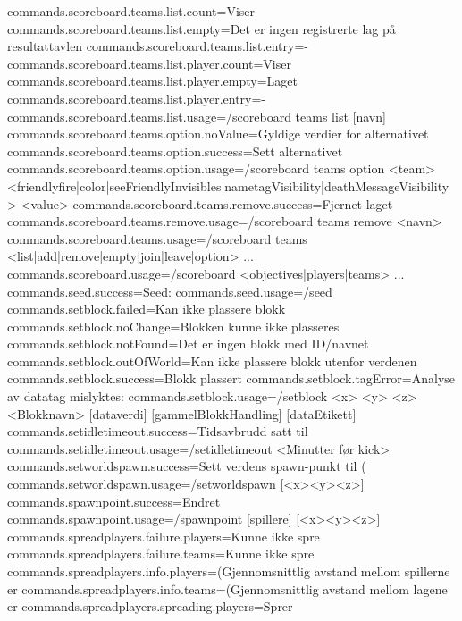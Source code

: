 commands.scoreboard.teams.list.count=Viser %
commands.scoreboard.teams.list.empty=Det er ingen registrerte lag på resultattavlen
commands.scoreboard.teams.list.entry=-%
commands.scoreboard.teams.list.player.count=Viser %
commands.scoreboard.teams.list.player.empty=Laget %
commands.scoreboard.teams.list.player.entry=- %
commands.scoreboard.teams.list.usage=/scoreboard teams list [navn]
commands.scoreboard.teams.option.noValue=Gyldige verdier for alternativet %
commands.scoreboard.teams.option.success=Sett alternativet %
commands.scoreboard.teams.option.usage=/scoreboard teams option <team> <friendlyfire|color|seeFriendlyInvisibles|nametagVisibility|deathMessageVisibility> <value>
commands.scoreboard.teams.remove.success=Fjernet laget %
commands.scoreboard.teams.remove.usage=/scoreboard teams remove <navn>
commands.scoreboard.teams.usage=/scoreboard teams <list|add|remove|empty|join|leave|option> ...
commands.scoreboard.usage=/scoreboard <objectives|players|teams> ...
commands.seed.success=Seed: %
commands.seed.usage=/seed
commands.setblock.failed=Kan ikke plassere blokk
commands.setblock.noChange=Blokken kunne ikke plasseres
commands.setblock.notFound=Det er ingen blokk med ID/navnet %
commands.setblock.outOfWorld=Kan ikke plassere blokk utenfor verdenen
commands.setblock.success=Blokk plassert
commands.setblock.tagError=Analyse av datatag mislyktes: %
commands.setblock.usage=/setblock <x> <y> <z> <Blokknavn> [dataverdi] [gammelBlokkHandling] [dataEtikett]
commands.setidletimeout.success=Tidsavbrudd satt til %
commands.setidletimeout.usage=/setidletimeout <Minutter før kick>
commands.setworldspawn.success=Sett verdens spawn-punkt til (%
commands.setworldspawn.usage=/setworldspawn [<x><y><z>]
commands.spawnpoint.success=Endret %
commands.spawnpoint.usage=/spawnpoint [spillere] [<x><y><z>]
commands.spreadplayers.failure.players=Kunne ikke spre %
commands.spreadplayers.failure.teams=Kunne ikke spre %
commands.spreadplayers.info.players=(Gjennomsnittlig avstand mellom spillerne er %
commands.spreadplayers.info.teams=(Gjennomsnittlig avstand mellom lagene er %
commands.spreadplayers.spreading.players=Sprer %
